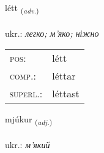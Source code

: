 \documentclass[frontgrid, backgrid]{flacards}\usepackage[]{graphicx}\usepackage[]{xcolor}
\begin{document}
\renewcommand{\flhead}{\vskip5pt \fboxsep=0pt {\small\bfseries\footnotesize Atviksorð | прислівник}}
\renewcommand{\fcfoot}{\vskip5pt \fboxsep=0pt \hspace{2pt}{\small\bfseries\footnotesize 2K}}

\renewcommand{\blhead}{\vskip5pt {\small\bfseries\footnotesize Atviksorð | прислівник }}
\renewcommand{\bcfoot}{\vskip5pt \hspace{2pt}{\small\bfseries\footnotesize 2K}}


{létt \small{\textsubscript{(\textit{adv.})}} \\[1ex] %
\textphonetic{[ljɛht]} \\
ukr.: \emph{легко; м'яко; ніжно} \\  [2ex]
\renewcommand*{\arraystretch}{0.8}
\begin{tabular}{ll}
\textsc{pos}: & létt \\ 
\textsc{comp.}: & léttar \\ 
\textsc{superl.}: & léttast \\
\end{tabular}
}

\renewcommand{\flhead}{\vskip5pt \fboxsep=0pt {\small\bfseries\footnotesize Lýsingarorð | прикметник}}
\renewcommand{\fcfoot}{\vskip5pt \fboxsep=0pt \hspace{2pt}{\small\bfseries\footnotesize 2K}}

\renewcommand{\blhead}{\vskip5pt {\small\bfseries\footnotesize Lýsingarorð | прикметник }}
\renewcommand{\bcfoot}{\vskip5pt \hspace{2pt}{\small\bfseries\footnotesize 2K}}


{mjúkur \small{\textsubscript{(\textit{adj.})}} \\[1ex] %
\textphonetic{[mjuːkʏr]} \\
ukr.: \emph{м'який} \\  [2ex]
\renewcommand*{\arraystretch}{0.8}
}
\end{document}
